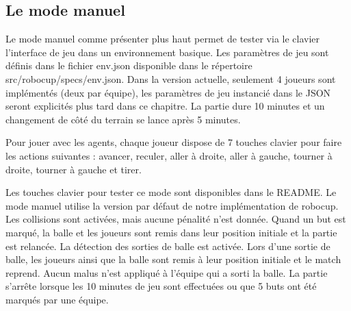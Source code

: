 \documentclass[11pt, a4paper]{article}
\begin{document}
	\subsection{Le mode manuel}
	Le mode manuel comme présenter plus haut permet de tester via le clavier l'interface de jeu dans un environnement basique.
	Les paramètres de jeu sont définis dans le fichier env.json disponible dans le répertoire src/robocup/specs/env.json.
	Dans la version actuelle, seulement 4 joueurs sont implémentés (deux par équipe), les paramètres de jeu instancié dans le JSON seront explicités plus tard dans ce chapitre.
	La partie dure 10 minutes et un changement de côté du terrain se lance après 5 minutes.

	Pour jouer avec les agents, chaque joueur dispose de 7 touches clavier pour faire les actions suivantes : avancer, reculer, aller à droite, aller à gauche, tourner à droite, tourner à gauche et tirer.

	Les touches clavier pour tester ce mode sont disponibles dans le README.
	Le mode manuel utilise la version par défaut de notre implémentation de robocup. Les collisions sont activées, mais aucune pénalité n'est donnée. Quand un but est marqué, la balle et les joueurs sont remis dans leur position initiale et la partie est relancée. La détection des sorties de balle est activée. Lors d'une sortie de balle, les joueurs ainsi que la balle sont remis à leur position initiale et le match reprend. Aucun malus n'est appliqué à l'équipe qui a sorti la balle. La partie s'arrête lorsque les 10 minutes de jeu sont effectuées ou que 5 buts ont été marqués par une équipe.
\end{document}
